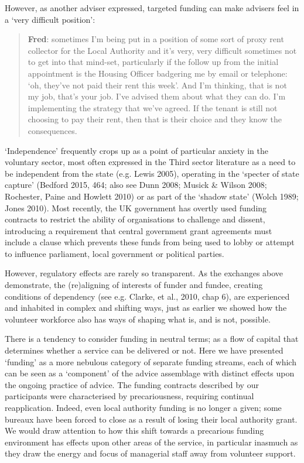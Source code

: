 However, as another adviser expressed, targeted funding can make advisers feel in a ‘very difficult position’:
    \blockquote{\textnormal{\bfseries Fred}: sometimes I’m being put in a position of some sort of proxy rent collector for the Local Authority and it’s very, very difficult sometimes not to get into that mind-set, particularly if the follow up from the initial appointment is the Housing Officer badgering me by email or telephone: ‘oh, they’ve not paid their rent this week’. And I’m thinking, that is not my job, that’s your job. I’ve advised them about what they can do. I’m implementing the strategy that we’ve agreed. If the tenant is still not choosing to pay their rent, then that is their choice and they know the consequences.} 
‘Independence’ frequently crops up as a point of particular anxiety in the voluntary sector, most often expressed in the Third sector literature as a need to be independent from the state (e.g. Lewis 2005), operating in the ‘specter of state capture’ (Bedford 2015, 464; also see Dunn 2008; Musick \& Wilson 2008; Rochester, Paine and Howlett 2010) or as part of the ‘shadow state’ (Wolch 1989; Jones 2010). Most recently, the UK government has overtly used funding contracts to restrict the ability of organisations to challenge and dissent, introducing a requirement that central government grant agreements must include a clause which prevents these funds from being used to lobby or attempt to influence parliament, local government or political parties.%
\par
However, regulatory effects are rarely so transparent. As the exchanges above demonstrate, the (re)aligning of interests of funder and fundee, creating conditions of dependency (see e.g. Clarke, et al., 2010, chap 6), are experienced and inhabited in complex and shifting ways, just as earlier we showed how the volunteer workforce also has ways of shaping what is, and is not, possible.
\par
There is a tendency to consider funding in neutral terms; as a flow of capital that determines whether a service can be delivered or not. Here we have presented ‘funding’ as a more nebulous category of separate funding streams, each of which can be seen as a ‘component’ of the advice assemblage with distinct effects upon the ongoing practice of advice. The funding contracts described by our participants were characterised by precariousness, requiring continual reapplication. Indeed, even local authority funding is no longer a given; some bureaux have been forced to close as a result of losing their local authority grant. We would draw attention to how this shift towards a precarious funding environment has effects upon other areas of the service, in particular inasmuch as they draw the energy and focus of managerial staff away from volunteer support. 
